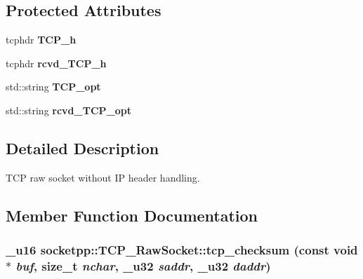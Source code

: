 \subsection*{Protected Attributes}
\begin{CompactItemize}
\item 
\hypertarget{classsocketpp_1_1TCP__RawSocket_d1980411bd147dd67f6d9d9578414c17}{
tcphdr \textbf{TCP\_\-h}}
\label{classsocketpp_1_1TCP__RawSocket_d1980411bd147dd67f6d9d9578414c17}

\item 
\hypertarget{classsocketpp_1_1TCP__RawSocket_12b2d2f00d02c377301fc10e1209a8b8}{
tcphdr \textbf{rcvd\_\-TCP\_\-h}}
\label{classsocketpp_1_1TCP__RawSocket_12b2d2f00d02c377301fc10e1209a8b8}

\item 
\hypertarget{classsocketpp_1_1TCP__RawSocket_380529364d9488faf998543d433d8fe6}{
std::string \textbf{TCP\_\-opt}}
\label{classsocketpp_1_1TCP__RawSocket_380529364d9488faf998543d433d8fe6}

\item 
\hypertarget{classsocketpp_1_1TCP__RawSocket_b7bddcb31a7a310bcf61fcc474ded465}{
std::string \textbf{rcvd\_\-TCP\_\-opt}}
\label{classsocketpp_1_1TCP__RawSocket_b7bddcb31a7a310bcf61fcc474ded465}

\end{CompactItemize}


\subsection{Detailed Description}
TCP raw socket without IP header handling. 

\subsection{Member Function Documentation}
\hypertarget{classsocketpp_1_1TCP__RawSocket_d0b16fff831e7e756a127cc47de4b9aa}{
\subsubsection{\setlength{\rightskip}{0pt plus 5cm}\_\-u16 socketpp::TCP\_\-RawSocket::tcp\_\-checksum (const void $\ast$ {\em buf}, \/  size\_\-t {\em nchar}, \/  \_\-u32 {\em saddr}, \/  \_\-u32 {\em daddr})}}
\label{classsocketpp_1_1TCP__RawSocket_d0b16fff831e7e756a127cc47de4b9aa}


